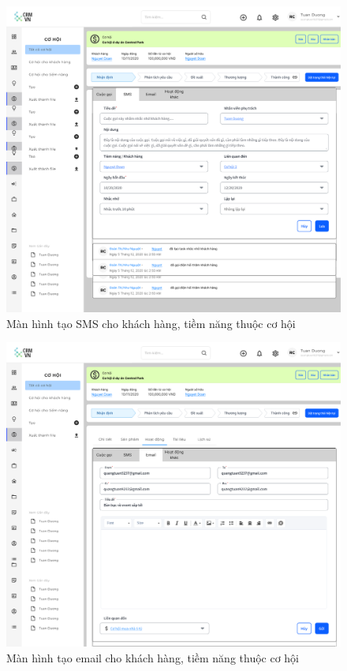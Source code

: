 \documentclass[12pt,a4paper]{article}
\begin{document}
\begin{enumerate}
\begin{itemize}
            \begin{figure}[H]
                \centering \includegraphics[width=\textwidth]{Img/Nguyet/Cohoi/smscohoi.png}
                \vspace{0.5cm}
                \caption{Màn hình tạo SMS cho khách hàng, tiềm năng thuộc cơ hội }
                \label{smscohoi}
            \end{figure}

            \begin{figure}[H]
                \centering \includegraphics[width=\textwidth]{Img/Nguyet/Cohoi/emaicohoi.png}
                \vspace{0.5cm}
                \caption{Màn hình tạo email cho khách hàng, tiềm năng thuộc cơ hội }
                \label{emailcohoi}
            \end{figure}


\end{itemize}
\end{enumerate}
\end{document}
